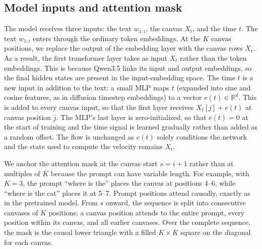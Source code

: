\documentclass[11pt]{article}
\begin{document}
\subsection{Model inputs and attention mask}
The model receives three inputs: the text $w_{1:i}$, the canvas $X_t$, and the time $t$. The text $w_{1:i}$ enters through the ordinary token embeddings. At the $K$ canvas positions, we replace the output of the embedding layer with the canvas rows $X_t$. As a result, the first transformer layer takes as input $X_t$ rather than the token embeddings. This is because Qwen3.5 links its input and output embeddings, so the final hidden states are present in the input-embedding space. The time $t$ is a new input in addition to the text: a small MLP maps $t$ (expanded into sine and cosine features, as in diffusion timestep embeddings) to a vector $e(t)\in\mathbb{R}^{d}$. This is added to every canvas input, so that the first layer receives $X_t[j] + e(t)$ at canvas position $j$. The MLP's last layer is zero-initialized, so that $e(t)=0$ at the start of training and the time signal is learned gradually rather than added as a random offset. The flow is unchanged as $e(t)$ solely conditions the network and the state used to compute the velocity remains $X_t$.

We anchor the attention mask at the canvas start $s=i+1$ rather than at multiples of $K$ because the prompt can have variable length. For example, with $K=3$, the prompt ``where is the'' places the canvas at positions 4--6, while ``where is the cat'' places it at 5--7. Prompt positions attend causally, exactly as in the pretrained model. From $s$ onward, the sequence is split into consecutive canvases of $K$ positions; a canvas position attends to the entire prompt, every position within its canvas, and all earlier canvases. Over the complete sequence, the mask is the causal lower triangle with a filled $K\times K$ square on the diagonal for each canvas.
\end{document}
